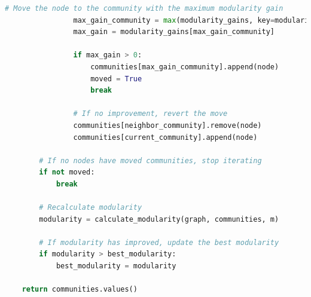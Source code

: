 \begin{lstlisting}[language=Python]
                # Move the node to the community with the maximum modularity gain
                max_gain_community = max(modularity_gains, key=modularity_gains.get)
                max_gain = modularity_gains[max_gain_community]

                if max_gain > 0:
                    communities[max_gain_community].append(node)
                    moved = True
                    break

                # If no improvement, revert the move
                communities[neighbor_community].remove(node)
                communities[current_community].append(node)

        # If no nodes have moved communities, stop iterating
        if not moved:
            break

        # Recalculate modularity
        modularity = calculate_modularity(graph, communities, m)

        # If modularity has improved, update the best modularity
        if modularity > best_modularity:
            best_modularity = modularity

    return communities.values()
\end{lstlisting}

